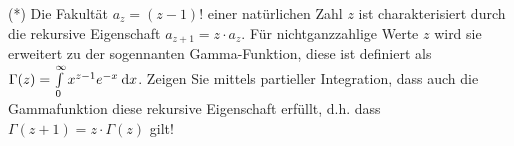 \item (*) Die Fakultät $a_z = (z-1)!$ einer natürlichen Zahl  $z$ ist charakterisiert durch die rekursive Eigenschaft $a_{z+1} = z\cdot a_z$. Für nichtganzzahlige Werte $z$ wird sie erweitert zu der sogennanten Gamma-Funktion, diese ist definiert als $\Gamma(z) = \int\limits_0^\infty x^{z-1} e^{-x} \:\mathrm{d}{x}$. Zeigen Sie mittels partieller Integration, dass auch die Gammafunktion diese rekursive Eigenschaft erfüllt, d.h. dass $\Gamma(z+1) = z \cdot \Gamma(z)$ gilt!
